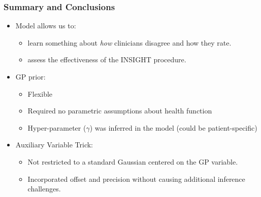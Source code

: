 \begin{frame}
	\frametitle{Summary and Conclusions}
	\begin{itemize}
		\item Model allows us to:
		\begin{itemize}
			\item learn something about \emph{how} clinicians disagree and how they rate.
			\item assess the effectiveness of the INSIGHT procedure.
		\end{itemize}
		\item<2-> GP prior:
		\begin{itemize}
			\item Flexible
			\item Required no parametric assumptions about health function
			\item Hyper-parameter ($\gamma$) was inferred in the model (could be patient-specific)
		\end{itemize}
		\item<3-> Auxiliary Variable Trick:
		\begin{itemize}
			\item Not restricted to a standard Gaussian centered on the GP variable.
			\item Incorporated offset and precision without causing additional inference challenges.
		\end{itemize}
	\end{itemize}
\end{frame}